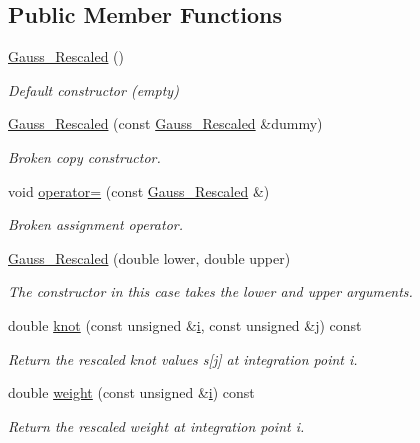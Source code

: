 \subsection*{Public Member Functions}
\begin{DoxyCompactItemize}
\item 
\hyperlink{classoomph_1_1Gauss__Rescaled_a3069cb5af93b223e5aa2170b0aa3239f}{Gauss\+\_\+\+Rescaled} ()
\begin{DoxyCompactList}\small\item\em Default constructor (empty) \end{DoxyCompactList}\item 
\hyperlink{classoomph_1_1Gauss__Rescaled_a8f83104458ac63bf3d1e8f668361ac64}{Gauss\+\_\+\+Rescaled} (const \hyperlink{classoomph_1_1Gauss__Rescaled}{Gauss\+\_\+\+Rescaled} \&dummy)
\begin{DoxyCompactList}\small\item\em Broken copy constructor. \end{DoxyCompactList}\item 
void \hyperlink{classoomph_1_1Gauss__Rescaled_a97fa79682639597113f7e0f3cffcae85}{operator=} (const \hyperlink{classoomph_1_1Gauss__Rescaled}{Gauss\+\_\+\+Rescaled} \&)
\begin{DoxyCompactList}\small\item\em Broken assignment operator. \end{DoxyCompactList}\item 
\hyperlink{classoomph_1_1Gauss__Rescaled_a8ddf7f6af907a044fc0b03a24b6c1fd5}{Gauss\+\_\+\+Rescaled} (double lower, double upper)
\begin{DoxyCompactList}\small\item\em The constructor in this case takes the lower and upper arguments. \end{DoxyCompactList}\item 
double \hyperlink{classoomph_1_1Gauss__Rescaled_a66a4da25fa9d11f78cd7561fc049e488}{knot} (const unsigned \&\hyperlink{cfortran_8h_adb50e893b86b3e55e751a42eab3cba82}{i}, const unsigned \&j) const
\begin{DoxyCompactList}\small\item\em Return the rescaled knot values s\mbox{[}j\mbox{]} at integration point i. \end{DoxyCompactList}\item 
double \hyperlink{classoomph_1_1Gauss__Rescaled_ae2e516ecfce3a17a6c0a29e40aa55155}{weight} (const unsigned \&\hyperlink{cfortran_8h_adb50e893b86b3e55e751a42eab3cba82}{i}) const
\begin{DoxyCompactList}\small\item\em Return the rescaled weight at integration point i. \end{DoxyCompactList}\end{DoxyCompactItemize}
